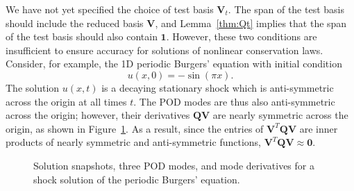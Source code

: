 \documentclass[preprint,10pt]{elsarticle}
\theoremstyle{definition}
\theoremstyle{lemma}
\theoremstyle{theorem}
\theoremstyle{assumption}
\begin{document}
We have not yet specified the choice of test basis $\bm{V}_t$.  The span of the test basis should include the reduced basis $\bm{V}$, and Lemma~\ref{thm:Qt} implies that the span of the test basis should also contain $\bm{1}$.  However, these two conditions are insufficient to ensure accuracy for solutions of nonlinear conservation laws.  Consider, for example, the 1D periodic Burgers' equation with initial condition 
\[
u(x,0) = -\sin(\pi x).
\]
The solution $u(x,t)$ is a decaying stationary shock which is anti-symmetric across the origin at all times $t$.  The POD modes are thus also anti-symmetric across the origin; however, their derivatives $\bm{Q}\bm{V}$ are nearly symmetric across the origin, as shown in Figure~\ref{fig:modeQ}.  As a result, since the entries of $\bm{V}^T\bm{Q}\bm{V}$ are inner products of nearly symmetric and anti-symmetric functions, $\bm{V}^T\bm{Q}\bm{V} \approx \bm{0}$.
\begin{figure}[!h]
\centering
{}
\hspace{.1em}
\hspace{.1em}
\caption{Solution snapshots, three POD modes, and mode derivatives for a shock solution of the periodic Burgers' equation. }
\label{fig:modeQ}
\end{figure}
\end{document}
